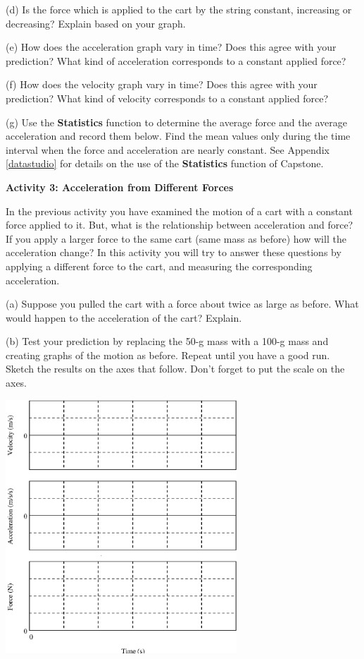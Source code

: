 (d) Is the force which is applied to the cart by the string constant, increasing
or decreasing? Explain based on your graph.
\answerspace{15mm}

\pagebreak[2]
(e) How does the acceleration graph vary in time? Does this agree with your
prediction? What kind of acceleration corresponds to a constant applied force?
\answerspace{20mm}

(f) How does the velocity graph vary in time? Does this agree with your prediction?
What kind of velocity corresponds to a constant applied force?
\answerspace{20mm}

(g) Use the \textbf{Statistics} function to determine the average force and the average acceleration
and record them below. Find the mean values only during the time interval when
the force and acceleration are nearly constant. See Appendix \ref{datastudio} for details on
the use of the \textbf{Statistics} function of Capstone.
\answerspace{20mm}

\textbf{Activity 3: Acceleration from Different Forces }

In the previous activity you have examined the motion of a cart with a constant
force applied to it. But, what is the relationship between acceleration and
force? If you apply a larger force to the same cart (same mass as before) how
will the acceleration change? In this activity you will try to answer these
questions by applying a different force to the cart, and measuring the corresponding
acceleration. 

(a) Suppose you pulled the cart with a force about twice as large as before.
What would happen to the acceleration of the cart? Explain.
\answerspace{20mm}

\pagebreak[3]
(b) Test your prediction by replacing the 50-g mass with a 100-g mass and creating graphs of the motion as before. Repeat until you have a good run. Sketch the
results on the axes that follow. Don't forget to put the scale on the axes.

\vspace{0.3cm}
{\par\centering \includegraphics[width=0.65\textwidth]{force1/force1_fig5.eps} \par}
\vspace{0.3cm}

